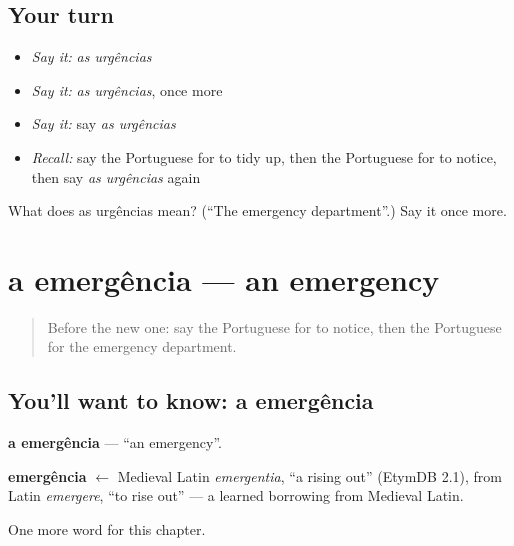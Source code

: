 \subsection*{Your turn}
\begin{itemize}
\raggedright
  \item \emph{Say it:} \emph{as urgências}
  \item \emph{Say it:} \emph{as urgências}, once more
  \item \emph{Say it:} say \emph{as urgências}
  \item \emph{Recall:} say the Portuguese for to tidy up, then the Portuguese for to notice, then say \emph{as urgências} again
\end{itemize}

\begin{tcolorbox}[breakable,colback=teal!4,colframe=teal!35!black,title={Before you move on}]
What does as urgências mean? (\textquotedblleft{}The emergency department\textquotedblright{}.) Say it once more.
\end{tcolorbox}
\section[a emergência]{a emergência — an emergency}

\label{lesson:PT-C240-emergencia}



\begin{quote}
Before the new one: say the Portuguese for to notice, then the Portuguese for the emergency department.
\end{quote}

\subsection*{You'll want to know: a emergência}
\textbf{a emergência} — \textquotedblleft{}an emergency\textquotedblright{}.

\begin{cousinweb}
\textbf{emergência} $\leftarrow$ Medieval Latin \emph{emergentia}, \textquotedblleft{}a rising out\textquotedblright{} (EtymDB 2.1), from Latin \emph{emergere}, \textquotedblleft{}to rise out\textquotedblright{} — a learned borrowing from Medieval Latin.
\end{cousinweb}

\begin{grammarlens}[title={What you've built}]
One more word for this chapter.
\end{grammarlens}

